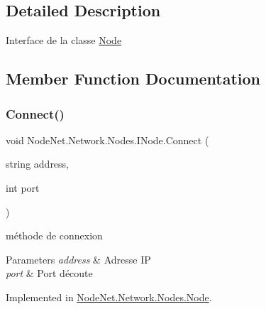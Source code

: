 \subsection{Detailed Description}
Interface de la classe \hyperlink{class_node_net_1_1_network_1_1_nodes_1_1_node}{Node} 



\subsection{Member Function Documentation}
\mbox{\label{interface_node_net_1_1_network_1_1_nodes_1_1_i_node_a639c5f1dc82ca81b531ab7efb41ab404}} 
\subsubsection{\texorpdfstring{Connect()}{Connect()}}
{\footnotesize\ttfamily void Node\+Net.\+Network.\+Nodes.\+I\+Node.\+Connect (\begin{DoxyParamCaption}\item[{string}]{address,  }\item[{int}]{port }\end{DoxyParamCaption})}



méthode de connexion 


\begin{DoxyParams}{Parameters}
{\em address} & Adresse IP\\
\hline
{\em port} & Port d\textquotesingle{}écoute\\
\hline
\end{DoxyParams}


Implemented in \hyperlink{class_node_net_1_1_network_1_1_nodes_1_1_node_a649afad8e215121029809cc46c31e258}{Node\+Net.\+Network.\+Nodes.\+Node}.

\mbox{\label{interface_node_net_1_1_network_1_1_nodes_1_1_i_node_a8d325bc9a6e86d1cfd697692c603f7fb}} 
